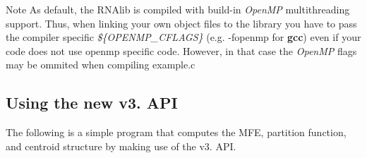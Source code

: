 \begin{DoxyNote}{Note}
As default, the R\+N\+Alib is compiled with build-\/in {\itshape Open\+MP} multithreading support. Thus, when linking your own object files to the library you have to pass the compiler specific {\itshape \$\{O\+P\+E\+N\+M\+P\+\_\+\+C\+F\+L\+A\+GS\}} (e.\+g. \textquotesingle{}-\/fopenmp\textquotesingle{} for {\bfseries gcc}) even if your code does not use openmp specific code. However, in that case the {\itshape Open\+MP} flags may be ommited when compiling example.\+c
\end{DoxyNote}
\hypertarget{mp_example_examples_c_new_API}{}\subsection{Using the \textquotesingle{}new\textquotesingle{} v3. A\+PI}\label{mp_example_examples_c_new_API}
The following is a simple program that computes the M\+FE, partition function, and centroid structure by making use of the v3. A\+PI. 

